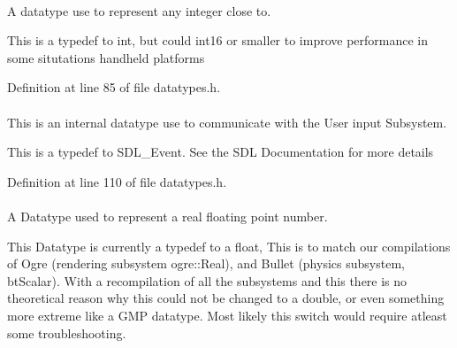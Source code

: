 \hypertarget{namespacephys_a7f09bf5585b2bb97613cd9aad4273a81}{
\paragraph[{Integer}]{}\hfill}
\label{df/dec/namespacephys_a7f09bf5585b2bb97613cd9aad4273a81}


A datatype use to represent any integer close to. 

This is a typedef to int, but could int16 or smaller to improve performance in some situtations handheld platforms 

Definition at line 85 of file datatypes.h.

\hypertarget{namespacephys_a8126d26e4507e66d09876988bb941fd4}{
\paragraph[{RawEvent}]{}\hfill}
\label{df/dec/namespacephys_a8126d26e4507e66d09876988bb941fd4}


This is an internal datatype use to communicate with the User input Subsystem. 

This is a typedef to SDL\_\-Event. See the SDL Documentation for more details 

Definition at line 110 of file datatypes.h.

\hypertarget{namespacephys_af7eb897198d265b8e868f45240230d5f}{
\paragraph[{Real}]{}\hfill}
\label{df/dec/namespacephys_af7eb897198d265b8e868f45240230d5f}


A Datatype used to represent a real floating point number. 

This Datatype is currently a typedef to a float, This is to match our compilations of Ogre (rendering subsystem ogre::Real), and Bullet (physics subsystem, btScalar). With a recompilation of all the subsystems and this there is no theoretical reason why this could not be changed to a double, or even something more extreme like a GMP datatype. Most likely this switch would require atleast some troubleshooting. 

